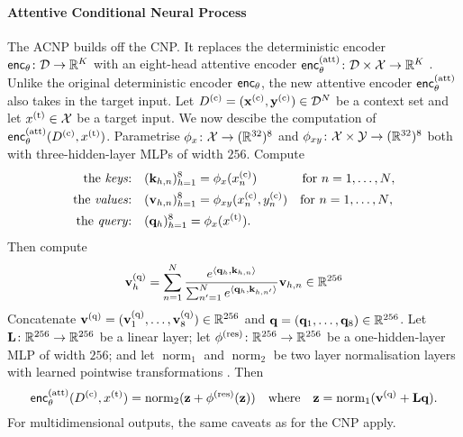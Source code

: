 \documentclass[12pt]{report}
\begin{document}
\paragraph{Attentive Conditional Neural Process \parencite[ACNP;][]{Kim:2019:Attentive_Neural_Processes}}
The ACNP builds off the CNP.
It replaces the deterministic encoder $\mathsf{enc}_\theta \colon \mathcal{D} \to \mathbb{R}^K$ with an 
eight-head attentive encoder $\enc_\theta\us{(att)}\colon \D \times \X \to \R^K$
\parencite{Bahdanau:2015:Neural_Machine_Translation_by_Jointly,Vaswani:2017:Attention_Is_All_You_Need}.
Unlike the original deterministic encoder $\mathsf{enc}_\theta$, the new attentive encoder $\enc_\theta\us{(att)}$ also takes in the target input.
Let $D\us{(c)} = (\vx\us{(c)}, \vy\us{(c)}) \in \D^N$ be a context set and let $x\us{(t)} \in \X$ be a target input.
We now descibe the computation of $\enc_\theta\us{(att)}(D\us{(c)}, x\us{(t)})$.
Parametrise $\phi_x\colon \mathcal{X} \to (\mathbb{R}^{32})^8$ and $\phi_{xy}\colon \mathcal{X} \times \mathcal{Y} \to (\mathbb{R}^{32})^8$ both with three-hidden-layer MLPs of width $256$.
Compute
\begin{align}
    \text{the \emph{keys}:} & \quad (\vk_{h,n})_{h=1}^8 = \phi_{x}(x\us{(c)}_n) \quad\hspace{26pt} \text{for $n = 1, \ldots, N$}, \\
    \text{the \emph{values}:} & \quad (\vv_{h,n})_{h=1}^8 = \phi_{xy}(x\us{(c)}_n, y\us{(c)}_n) \quad \text{for $n = 1, \ldots, N$}, \\
    \text{the \emph{query}:} & \quad (\vq_h)_{h=1}^8 = \phi_{x}(x\us{(t)}).
\end{align}
Then compute
\begin{equation}
    \vv\us{(q)}_h = \sum_{n=1}^N  \frac{e^{\lra{\vq_h, \vk_{h, n}}}}{\sum_{n'=1}^Ne^{\lra{\vq_h, \vk_{h, n'}}}} \vv_{h,n} \in \R^{256}
\end{equation}
Concatenate $\vv\us{(q)} = (\vv_1\us{(q)}, \ldots, \vv_8\us{(q)}) \in \R^{256} $ and $\mathbf{q} = (\mathbf{q}_1, \ldots, \mathbf{q}_8) \in \mathbb{R}^{256}$.
Let $\mathbf{L} \colon \mathbb{R}^{256} \to \mathbb{R}^{256}$ be a linear layer;
let $\phi\us{(res)}\colon \R^{256} \to \R^{256}$ be a one-hidden-layer MLP of width $256$;
and let $\operatorname{norm}_1$ and $\operatorname{norm}_2$ be two layer normalisation layers with learned pointwise transformations \parencite{Ba:2016:Layer_Normalization}.
Then
\begin{equation}
    \enc_\theta\us{(att)}(D\us{(c)}, x\us{(t)})
    = \operatorname{norm}_2(\vz + \phi\us{(res)}(\vz))
    \quad\text{where}\quad
    \vz = \operatorname{norm}_1(\vv\us{(q)} + \mL \vq).
\end{equation}
For multidimensional outputs, the same caveats as for the CNP apply.
\end{document}
